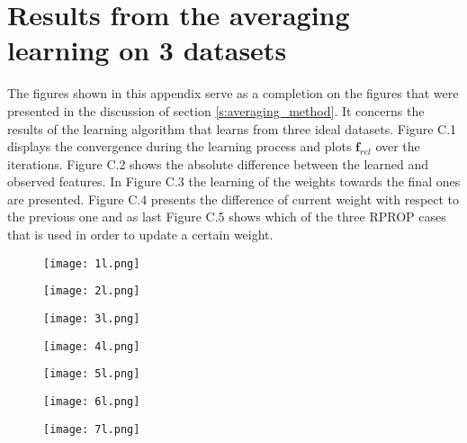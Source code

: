 \chapter{Results from the averaging learning on 3 datasets}
\label{app:C}
The figures shown in this appendix serve as a completion on the figures that were presented in the discussion of section \ref{s:averaging_method}. It concerns the results of the learning algorithm that learns from three ideal datasets. Figure C.1 displays the convergence during the learning process and plots $\bm{f}_{rel}$ over the iterations. Figure C.2 shows the absolute difference between the learned and observed features. In Figure C.3 the learning of the weights towards the final ones are presented. Figure C.4 presents the difference of current weight with respect to the previous one and as last Figure C.5 shows which of the three RPROP cases that is used in order to update a certain weight. 

\begin{figure}[h!]\label{stijn}
	\texttt{[image: 1l.png]}
\end{figure}


\begin{figure}[h!]
	\centering
	\texttt{[image: 2l.png]}
	\label{fig:lat_acc_val}
\end{figure}

\begin{figure}[h!]
	\centering
	\texttt{[image: 3l.png]}
	\label{fig:lat_acc_val}
\end{figure}


\begin{figure}[h!]
	\centering
	\texttt{[image: 4l.png]}
	\label{fig:lat_acc_val}
\end{figure}


\begin{figure}[h!]
	\centering
	\texttt{[image: 5l.png]}
	\label{fig:lat_acc_val}
\end{figure}


\begin{figure}[h!]
	\centering
	\texttt{[image: 6l.png]}
	\label{fig:lat_acc_val}
\end{figure}


\begin{figure}[h!]
	\centering
	\texttt{[image: 7l.png]}
	\label{fig:lat_acc_val}
\end{figure}


